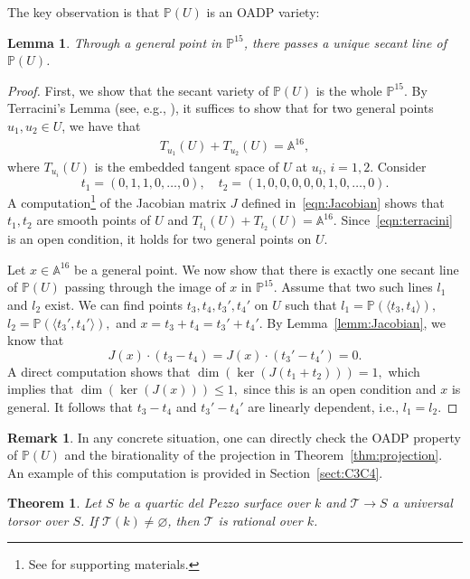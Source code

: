 \documentclass[12pt, reqno]{amsart}
\theoremstyle{plain}
\newtheorem{theo}[prop]{Theorem}
\newtheorem{lemm}[prop]{Lemma}
\theoremstyle{remark}
\theoremstyle{definition}
\newtheorem{rema}[prop]{Remark}
\numberwithin{equation}{section}
\def\cT{{\mathcal T}}
\def\bA{{\mathbb A}}
\def\bP{{\mathbb P}}
\begin{document}
The key observation is that $\bP(U)$ is an OADP variety:
\begin{lemm}
\label{lemm:secant}
   Through a general point in $\bP^{15}$, there passes a unique secant line of $\bP(U)$. 
\end{lemm}
\begin{proof}
  First, we show that the secant variety of $\bP(U)$ is the whole $\bP^{15}$. By Terracini’s Lemma (see, e.g., \cite[Theorem 1.1]{projection}), it suffices to show that for two general points $u_1,u_2\in U$, we have that
  \begin{align}\label{eqn:terracini}
      T_{u_1}(U)+T_{u_2}(U)=\bA^{16},
  \end{align}
   where $T_{u_i}(U)$ is the embedded tangent space of $U$ at $u_i$, $i=1,2.$ 
 Consider 
 $$
t_1=(0,1,1,0,\ldots,0),\quad t_2=(1,0,0,0,0,0,1,0,\ldots,0).
$$
A computation\footnote{See \cite{TZdp4-tables} for supporting materials.} of the Jacobian matrix $J$ defined in~\eqref{eqn:Jacobian}  shows that $t_1,t_2$ are smooth points of $U$ and $
  T_{t_1}(U)+T_{t_2}(U)=\bA^{16}.
  $
Since~\eqref{eqn:terracini} is an open condition, it holds for  two general points on $U$.

Let $x\in \bA^{16}$ be a general point. We now show that there is exactly one secant line of $\bP(U)$ passing through the image of $x$ in $\bP^{15}$.
 Assume that  two such lines $l_1$ and $l_2$ exist. We can find points $t_3,t_4,t_3',t_4'$ on $U$ such that
$
l_1=\bP(\langle t_3,t_4\rangle),$ $ l_2=\bP(\langle t_3', t_4'\rangle),
$ and $x=t_3+t_4=t_3'+t_4'$.
By Lemma~\ref{lemm:Jacobian}, we know that 
$$
J(x)\cdot (t_3-t_4)=J(x)\cdot(t_3'-t_4')=0.
$$
A direct computation shows that 
$
   \dim(\ker(J(t_1+t_2)))=1,
$
which implies that 
$
   \dim(\ker(J(x)))\leq 1,
$
since this is an open condition and $x$ is general.
It follows  that $t_3-t_4$ and $t_3'-t_4'$ are linearly dependent, i.e., $l_1=l_2.$
\end{proof}

\begin{rema}
In any concrete situation, one can directly check the OADP property of $\bP(U)$ and the birationality of the projection in Theorem~\ref{thm:projection}. An example of this computation is provided in Section~\ref{sect:C3C4}.
\end{rema}



\begin{theo}\label{thm:mainrepeat}
    Let $S$ be a quartic del Pezzo surface over $k$ and $\cT\to S$ a universal torsor over $S$. If $\cT(k)\neq \varnothing$, then  $\cT$ is rational over $k$. 
\end{theo}
\end{document}
